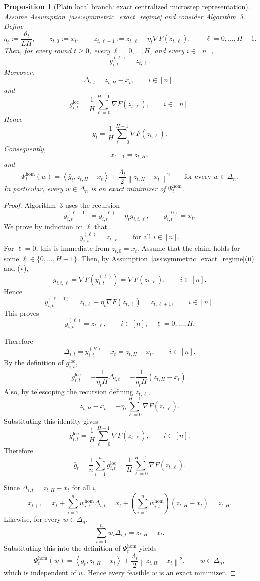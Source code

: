 \documentclass{article}
\newtheorem{proposition}[theorem]{Proposition}
\theoremstyle{definition}
\newcommand{\norm}[1]{\left\lVert #1\right\rVert}
\newcommand{\ip}[2]{\left\langle #1,#2\right\rangle}
\begin{document}
\begin{proposition}[Plain local branch: exact centralized microstep representation]
\label{prop:plain_exact_microsteps}
Assume Assumption~\ref{ass:symmetric_exact_regime} and consider Algorithm~3. Define
\[
\eta_t := \frac{\vartheta_t}{LH},
\qquad
z_{t,0} := x_t,
\qquad
z_{t,\ell+1} := z_{t,\ell} - \eta_t \nabla F(z_{t,\ell}),
\qquad \ell = 0,\dots,H-1.
\]
Then, for every round $t \ge 0$, every $\ell = 0,\dots,H$, and every $i \in [n]$,
\[
y_{i,t}^{(\ell)} = z_{t,\ell}.
\]
Moreover,
\[
\Delta_{i,t} = z_{t,H} - x_t,
\qquad i \in [n],
\]
and
\[
g_{i,t}^{\mathrm{loc}}
=
\frac1H \sum_{\ell=0}^{H-1} \nabla F(z_{t,\ell}),
\qquad i \in [n].
\]
Hence
\[
\bar g_t
=
\frac1H \sum_{\ell=0}^{H-1} \nabla F(z_{t,\ell}).
\]
Consequently,
\[
x_{t+1} = z_{t,H},
\]
and
\[
\Psi_t^{\mathrm{hom}}(w)
=
\ip{\bar g_t}{z_{t,H}-x_t}
+
\frac{\Lambda_t}{2}\norm{z_{t,H}-x_t}^2
\qquad \text{for every } w \in \Delta_n.
\]
In particular, every $w \in \Delta_n$ is an exact minimizer of $\Psi_t^{\mathrm{hom}}$.
\end{proposition}

\begin{proof}
Algorithm~3 uses the recursion
\[
y_{i,t}^{(\ell+1)} = y_{i,t}^{(\ell)} - \eta_t g_{i,t,\ell},
\qquad
y_{i,t}^{(0)} = x_t.
\]
We prove by induction on $\ell$ that
\[
y_{i,t}^{(\ell)} = z_{t,\ell}
\qquad \text{for all } i \in [n].
\]
For $\ell=0$, this is immediate from $z_{t,0}=x_t$.
Assume that the claim holds for some $\ell \in \{0,\dots,H-1\}$. Then, by Assumption~\ref{ass:symmetric_exact_regime}(ii) and (v),
\[
g_{i,t,\ell}
=
\nabla F\!\left(y_{i,t}^{(\ell)}\right)
=
\nabla F(z_{t,\ell}),
\qquad i \in [n].
\]
Hence
\[
y_{i,t}^{(\ell+1)}
=
z_{t,\ell} - \eta_t \nabla F(z_{t,\ell})
=
z_{t,\ell+1},
\qquad i \in [n].
\]
This proves
\[
y_{i,t}^{(\ell)} = z_{t,\ell},
\qquad i \in [n], \quad \ell=0,\dots,H.
\]

Therefore
\[
\Delta_{i,t}
=
y_{i,t}^{(H)} - x_t
=
z_{t,H} - x_t,
\qquad i \in [n].
\]
By the definition of $g_{i,t}^{\mathrm{loc}}$,
\[
g_{i,t}^{\mathrm{loc}}
=
-\frac{1}{\eta_t H}\Delta_{i,t}
=
-\frac{1}{\eta_t H}(z_{t,H}-x_t).
\]
Also, by telescoping the recursion defining $z_{t,\ell}$,
\[
z_{t,H} - x_t
=
-\eta_t \sum_{\ell=0}^{H-1} \nabla F(z_{t,\ell}).
\]
Substituting this identity gives
\[
g_{i,t}^{\mathrm{loc}}
=
\frac1H \sum_{\ell=0}^{H-1} \nabla F(z_{t,\ell}),
\qquad i \in [n].
\]
Therefore
\[
\bar g_t
=
\frac1n \sum_{i=1}^n g_{i,t}^{\mathrm{loc}}
=
\frac1H \sum_{\ell=0}^{H-1} \nabla F(z_{t,\ell}).
\]

Since $\Delta_{i,t}=z_{t,H}-x_t$ for all $i$,
\[
x_{t+1}
=
x_t + \sum_{i=1}^n w_{i,t}^{\mathrm{hom}}\Delta_{i,t}
=
x_t + \left(\sum_{i=1}^n w_{i,t}^{\mathrm{hom}}\right)(z_{t,H}-x_t)
=
z_{t,H}.
\]
Likewise, for every $w \in \Delta_n$,
\[
\sum_{i=1}^n w_i \Delta_{i,t} = z_{t,H}-x_t.
\]
Substituting this into the definition of $\Psi_t^{\mathrm{hom}}$ yields
\[
\Psi_t^{\mathrm{hom}}(w)
=
\ip{\bar g_t}{z_{t,H}-x_t}
+
\frac{\Lambda_t}{2}\norm{z_{t,H}-x_t}^2,
\qquad w \in \Delta_n,
\]
which is independent of $w$. Hence every feasible $w$ is an exact minimizer.
\end{proof}
\end{document}
